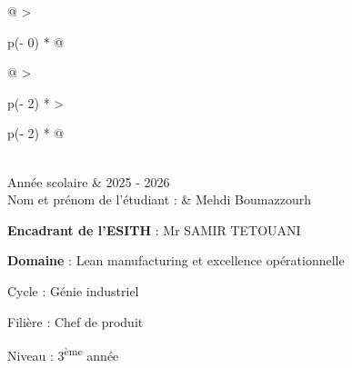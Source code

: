 \documentclass[
]{article}
\begin{document}
\begin{longtable}[]{@{}
  >{\raggedright\arraybackslash}p{(\columnwidth - 0\tabcolsep) * }@{}}
\begin{minipage}[b]{\linewidth}
\begin{tabular}{@{}
  >{\raggedright\arraybackslash}p{(\columnwidth - 2\tabcolsep) * }
  >{\raggedright\arraybackslash}p{(\columnwidth - 2\tabcolsep) * }@{}}
\toprule\noalign{}
 \\
\midrule\noalign{}
Année scolaire & 2025 - 2026 \\
Nom et prénom de l'étudiant : & Mehdi Boumazzourh \\
\bottomrule\noalign{}
\end{tabular}

\vspace{1em}

\textbf{Encadrant de l'ESITH} : Mr SAMIR TETOUANI

\textbf{Domaine} : Lean manufacturing et excellence opérationnelle

\vspace{1em}

\begin{center}
\end{center}

\vspace{1em}

Cycle : Génie industriel

Filière : Chef de produit

Niveau : 3\textsuperscript{ème} année

\end{minipage} \\
\midrule\noalign{}
\endhead
\bottomrule\noalign{}
\endlastfoot
\end{longtable}
\end{document}
